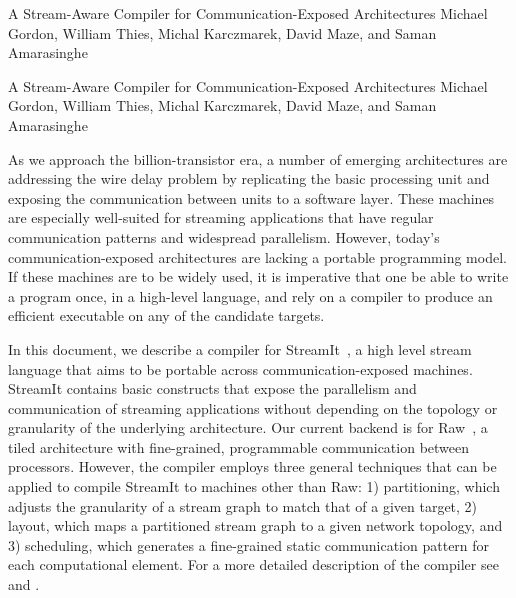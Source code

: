 

\formattitle%
  {A Stream-Aware Compiler for Communication-Exposed 
   Architectures}
  {Michael Gordon, William Thies, Michal Karczmarek, David Maze, and
  Saman Amarasinghe}

\formatcontents%
  {A Stream-Aware Compiler for Communication-Exposed 
  Architectures}
  {Michael Gordon, William Thies, Michal Karczmarek, David Maze, and
  Saman Amarasinghe}

%

As we approach the billion-transistor era, a number of emerging
architectures are addressing the wire delay problem by replicating the
basic processing unit and exposing the communication between units to
a software layer.  These machines are
especially well-suited for streaming applications that have regular
communication patterns and widespread parallelism.
However, today's communication-exposed architectures are lacking a
portable programming model.  If these machines are to be widely used,
it is imperative that one be able to write a program once, in a
high-level language, and rely on a compiler to produce an efficient
executable on any of the candidate targets. 

In this document, we describe a compiler for StreamIt~\cite{streamitcc},
a high level stream language that aims to be portable across
communication-exposed machines.  StreamIt contains basic constructs
that expose the parallelism and communication of streaming
applications without depending on the topology or granularity of the
underlying architecture.  Our current backend is for Raw~\cite{raw}, a
tiled architecture with fine-grained, programmable communication
between processors.  However, the compiler employs three general
techniques that can be applied to compile StreamIt to machines other
than Raw: 1) partitioning, which adjusts the granularity of a stream
graph to match that of a given target, 2) layout, which maps a
partitioned stream graph to a given network topology, and 3)
scheduling, which generates a fine-grained static communication
pattern for each computational element.  For a more detailed 
description of the compiler see
\cite{streamit-asplos} and \cite{mgordon-thesis}.

